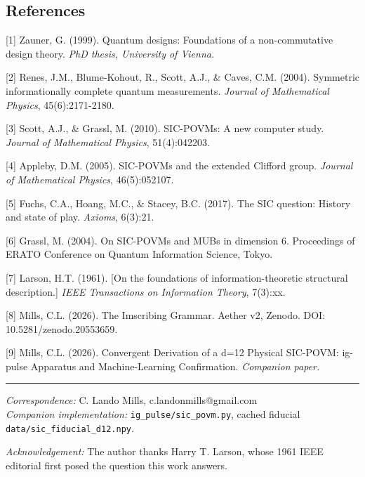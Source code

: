 \documentclass[12pt,a4paper]{article}
\begin{document}
\hypertarget{references}{%
\subsection{References}\label{references}}

{[}1{]} Zauner, G. (1999). Quantum designs: Foundations of a
non-commutative design theory. \emph{PhD thesis, University of Vienna.}

{[}2{]} Renes, J.M., Blume-Kohout, R., Scott, A.J., \& Caves, C.M.
(2004). Symmetric informationally complete quantum measurements.
\emph{Journal of Mathematical Physics}, 45(6):2171-2180.

{[}3{]} Scott, A.J., \& Grassl, M. (2010). SIC-POVMs: A new computer
study. \emph{Journal of Mathematical Physics}, 51(4):042203.

{[}4{]} Appleby, D.M. (2005). SIC-POVMs and the extended Clifford group.
\emph{Journal of Mathematical Physics}, 46(5):052107.

{[}5{]} Fuchs, C.A., Hoang, M.C., \& Stacey, B.C. (2017). The SIC
question: History and state of play. \emph{Axioms}, 6(3):21.

{[}6{]} Grassl, M. (2004). On SIC-POVMs and MUBs in dimension 6.
Proceedings of ERATO Conference on Quantum Information Science, Tokyo.

{[}7{]} Larson, H.T. (1961). {[}On the foundations of
information-theoretic structural description.{]} \emph{IEEE Transactions
on Information Theory}, 7(3):xx.

{[}8{]} Mills, C.L. (2026). The Imscribing Grammar. Aether v2, Zenodo.
DOI: 10.5281/zenodo.20553659.

{[}9{]} Mills, C.L. (2026). Convergent Derivation of a d=12 Physical
SIC-POVM: ig-pulse Apparatus and Machine-Learning Confirmation.
\emph{Companion paper.}

\begin{center}\rule{0.5\linewidth}{0.5pt}\end{center}

\emph{Correspondence:} C. Lando Mills, c.landonmills@gmail.com\\
\emph{Companion implementation:} \texttt{ig\_pulse/sic\_povm.py}, cached
fiducial \texttt{data/sic\_fiducial\_d12.npy}.

\emph{Acknowledgement:} The author thanks Harry T. Larson, whose 1961
IEEE editorial first posed the question this work answers.
\end{document}
